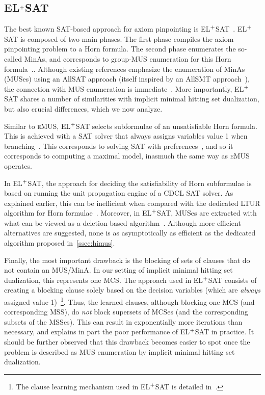 \documentclass{llncs}
\newcommand{\tn}{\textnormal}
\newcommand{\emus}{\textsc{eMUS}\xspace}
\newcommand{\elsat}{EL$^{\tn{+}}$SAT\xspace}
\begin{document}
\subsection{\elsat}

The best known SAT-based approach for axiom pinpointing is
\elsat~\cite{sebastiani-cade09,vescovi-phd11,sebastiani-tr15}.
\elsat is composed of two main phases. The first phase compiles the
axiom pinpointing problem to a Horn formula. 
The second phase enumerates the so-called MinAs, and corresponds to
group-MUS enumeration for this Horn formula~\cite{ams-corr15}..
Although existing references emphasize the enumeration of MinAs (MUSes) using
an AllSAT approach (itself inspired by an AllSMT
approach~\cite{nieuwenhuis-cav06}), the connection with MUS
enumeration is immediate~\cite{ams-corr15}. More importantly, \elsat
shares a number of similarities with implicit minimal hitting set
dualization, but also crucial differences, which we now analyze.

Similar to \emus, \elsat selects subformulae of an unsatisfiable Horn
formula. This is achieved with a SAT solver that always assigns
variables value 1 when branching~\cite{sebastiani-tr15}. This
corresponds to solving SAT with
preferences~\cite{giunchiglia-ecai06,giunchiglia-aicomm13}, and so it
corresponds to computing a maximal model, inasmuch the same way as
\emus operates.


In \elsat, the approach for deciding the satisfiability of Horn
subformulae is based on running the unit propagation engine of a CDCL 
SAT solver. As explained earlier, this can be inefficient when
compared with the dedicated LTUR algorithm for Horn
formulae~\cite{minoux-ipl88}.
Moreover, in \elsat, MUSes are extracted with what can be viewed as a
deletion-based algorithm~\cite{bakker-ijcai93,blms-aicomm12}. Although
more efficient alternatives are suggested, none is as asymptotically
as efficient as the dedicated algorithm proposed
in~\autoref{ssec:himus}.

Finally, the most important drawback is the blocking of sets of
clauses that do not contain an MUS/MinA. In our setting of implicit
minimal hitting set dualization, this represents one MCS. The approach
used in \elsat consists of creating a blocking clause solely based on
the decision variables (which are {\em always} assigned value
1)~\cite{vescovi-phd11,sebastiani-tr15}\footnote{The clause learning
  mechanism used in \elsat is detailed in~\cite[page 17,
    first paragraph]{sebastiani-tr15}.}. Thus, the learned clauses,
although blocking one MCS (and corresponding MSS), do {\em not} block 
supersets of MCSes (and the corresponding subsets of the MSSes). This
can result in exponentially more iterations than necessary, and
explains in part the poor performance of \elsat in practice.
It should be further observed that this drawback becomes easier to
spot once the problem is described as MUS enumeration by implicit
minimal hitting set dualization.
\end{document}
